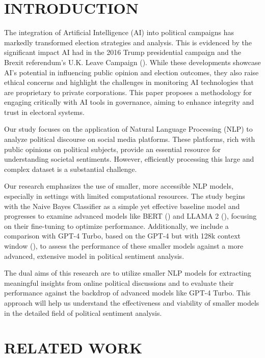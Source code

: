 \documentclass[10pt]{article}
\begin{document}
\begin{multicols}{2}
\fontsize{10}{12}\selectfont

\section{INTRODUCTION}
The integration of Artificial Intelligence (AI) into political campaigns has markedly transformed election strategies and analysis. This is evidenced by the significant impact AI had in the 2016 Trump presidential campaign and the Brexit referendum's U.K. Leave Campaign (\cite{8664495}). While these developments showcase AI's potential in influencing public opinion and election outcomes, they also raise ethical concerns and highlight the challenges in monitoring AI technologies that are proprietary to private corporations. This paper proposes a methodology for engaging critically with AI tools in governance, aiming to enhance integrity and trust in electoral systems.

Our study focuses on the application of Natural Language Processing (NLP) to analyze political discourse on social media platforms. These platforms, rich with public opinions on political subjects, provide an essential resource for understanding societal sentiments. However, efficiently processing this large and complex dataset is a substantial challenge.

Our research emphasizes the use of smaller, more accessible NLP models, especially in settings with limited computational resources. The study begins with the Naive Bayes Classifier as a simple yet effective baseline model and progresses to examine advanced models like BERT (\cite{devlin2018bert}) and LLAMA 2 (\cite{touvron2023llama}), focusing on their fine-tuning to optimize performance. Additionally, we include a comparison with GPT-4 Turbo, based on the GPT-4 but with 128k context window (\cite{openai2023gpt4}), to assess the performance of these smaller models against a more advanced, extensive model in political sentiment analysis.

The dual aims of this research are to utilize smaller NLP models for extracting meaningful insights from online political discussions and to evaluate their performance against the backdrop of advanced models like GPT-4 Turbo. This approach will help us understand the effectiveness and viability of smaller models in the detailed field of political sentiment analysis.

\section{RELATED WORK}


\end{multicols}
\end{document}
